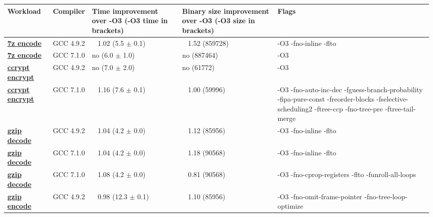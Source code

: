     \begin{tabular}{|l|l|p{1.2in}|p{0.9in}|p{1.8in}|}
     \hline
      \textbf{Workload} & \textbf{Compiler} & \textbf{Time improvement over -O3 (-O3 time in brackets)} & \textbf{Binary size improvement over -O3 (-O3 size in brackets)} & \textbf{Flags} \\ 
     \hline
      \textbf{ \href{http://cknowledge.org/repo/web.php?wcid=experiment:860174fc1b709377\&subpoint=ec934e93826572d2}{7z encode} } &  GCC 4.9.2  &  ~ 1.02 (5.5 $\pm$ 0.1)  &  ~ 1.52 (859728)  & {\small -O3 -fno-inline -flto }\\
     \hline
      \textbf{ \href{http://cknowledge.org/repo/web.php?wcid=experiment:03af5407d14468eb\&subpoint=6d4d4e8e1c6daac6}{7z encode} } &  GCC 7.1.0  &  no (6.0 $\pm$ 1.0)  &  no (887464)  & {\small -O3 }\\
     \hline
      \textbf{ \href{http://cknowledge.org/repo/web.php?wcid=experiment:89fd652535db438e\&subpoint=24844209902c136a}{ccrypt encrypt} } &  GCC 4.9.2  &  no (7.0 $\pm$ 2.0)  &  no (61772)  & {\small -O3 }\\
     \hline
      \textbf{ \href{http://cknowledge.org/repo/web.php?wcid=experiment:264c8a9a86776fcb\&subpoint=f8130c563953d484}{ccrypt encrypt} } &  GCC 7.1.0  &  ~ 1.16 (7.6 $\pm$ 0.1)  &  ~ 1.00 (59996)  & {\small -O3 -fno-auto-inc-dec -fguess-branch-probability -fipa-pure-const -freorder-blocks -fselective-scheduling2 -ftree-ccp -fno-tree-pre -ftree-tail-merge }\\
     \hline
      \textbf{ \href{http://cknowledge.org/repo/web.php?wcid=experiment:59dbd50c4fa98b6c\&subpoint=f4f3baa9717f1cee}{gzip decode} } &  GCC 4.9.2  &  ~ 1.04 (4.2 $\pm$ 0.0)  &  ~ 1.12 (85956)  & {\small -O3 -fno-inline -flto }\\
     \hline
      \textbf{ \href{http://cknowledge.org/repo/web.php?wcid=experiment:d2044082a58f5f78\&subpoint=64f3736c4460e87f}{gzip decode} } &  GCC 7.1.0  &  ~ 1.04 (4.2 $\pm$ 0.0)  &  ~ 1.18 (90568)  & {\small -O3 -fno-inline -flto }\\
     \hline
      \textbf{ \href{http://cknowledge.org/repo/web.php?wcid=experiment:d2044082a58f5f78\&subpoint=d6ae97514d86a01a}{gzip decode} } &  GCC 7.1.0  &  ~ 1.08 (4.2 $\pm$ 0.0)  &  ~ 0.81 (90568)  & {\small -O3 -fno-cprop-registers -flto -funroll-all-loops }\\
     \hline
      \textbf{ \href{http://cknowledge.org/repo/web.php?wcid=experiment:819a33f3e0a4efc3\&subpoint=d8685bf484cb1d9c}{gzip encode} } &  GCC 4.9.2  &  ~ 0.98 (12.3 $\pm$ 0.1)  &  ~ 1.10 (85956)  & {\small -O3 -fno-omit-frame-pointer -fno-tree-loop-optimize }\\

\end{tabular}
